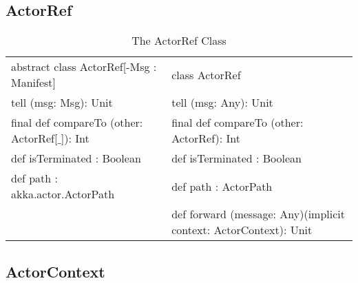 \subsection{ActorRef}
\begin{table}[h]\footnotesize
  \caption{The ActorRef Class}
  \label{actorRef_class}
  \centering
  \begin{tabular}{ l ||  l }
abstract class ActorRef[-Msg : Manifest] &  
class ActorRef\\

tell (msg: Msg): Unit &
tell (msg: Any): Unit\\

final def compareTo (other: ActorRef[$\_$]): Int &
final def compareTo (other: ActorRef): Int\\


def isTerminated : Boolean &
def isTerminated : Boolean\\

def path : akka.actor.ActorPath &
def path : ActorPath\\

& def forward (message: Any)(implicit context: ActorContext): Unit\\

  \end{tabular}
\end{table}

\subsection{ActorContext}

